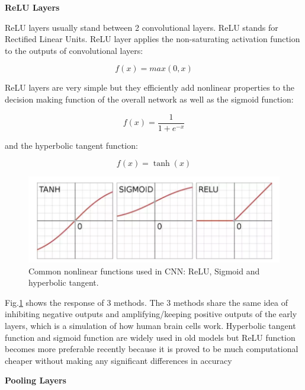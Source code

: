 \textbf{ReLU Layers} 

ReLU layers usually stand between 2 convolutional layers. ReLU stands for Rectified Linear Units. ReLU layer applies the non-saturating activation function to the outputs of convolutional layers:

\begin{equation} \label{eq:relu}
f(x) = max(0,x)
\end{equation}

ReLU layers are very simple but they efficiently add nonlinear properties to the decision
making function of the overall network as well as the sigmoid function:

\begin{equation} \label{eq:sigmoid}
f(x) = \frac{1}{1+e^{-x}}
\end{equation}

and the hyperbolic tangent function:

\begin{equation} \label{eq:hypo}
f(x) = \tanh(x)
\end{equation}

\begin{figure}[H]
  \centering
  \includegraphics[width=\linewidth]{figures/activation.png}
  \caption{Common nonlinear functions used in CNN: ReLU, Sigmoid and hyperbolic tangent.}
  \label{fig:activation}
\end{figure}

Fig.\ref{fig:activation} shows the response of 3 methods. The 3 methods share the same idea of inhibiting negative outputs and amplifying/keeping positive outputs of the early layers, which is a simulation of how human brain cells work. Hyperbolic tangent function and sigmoid function are widely used in old models but ReLU function becomes more preferable recently because it is proved to be much computational cheaper without making any significant differences in accuracy

\textbf{Pooling Layers} 

